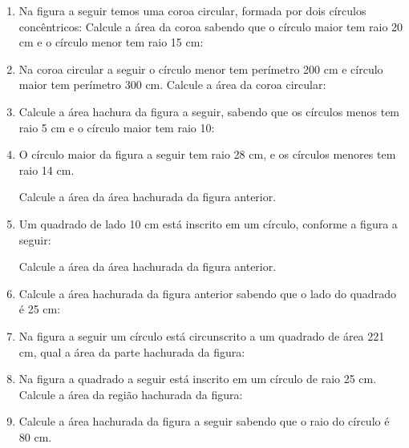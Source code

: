 \documentclass[twocolumn,oneside,a4paper,10pt]{article}
\begin{document}
\maketitle

\thispagestyle{empty}
\begin{enumerate}
\item Na figura a seguir temos uma coroa circular, formada por dois círculos concêntricos:
\noindent Calcule a área da coroa sabendo que o círculo maior tem raio 20 cm e o círculo menor tem raio 15 cm:

\item Na coroa circular a seguir o círculo menor tem perímetro 200 cm e círculo maior tem perímetro 300 cm.
\noindent Calcule a área da coroa circular:

\item Calcule a área hachura da figura a seguir, sabendo que os círculos menos tem raio 5 cm e o círculo maior tem raio 10:

\item O círculo maior da figura a seguir tem raio 28 cm, e os círculos menores tem raio 14 cm.

\noindent Calcule a área da área hachurada da figura anterior.

\item Um quadrado de lado 10 cm está inscrito em um círculo, conforme a figura a seguir:

\noindent Calcule a área da área hachurada da figura anterior.

\item Calcule a área hachurada da figura anterior sabendo que o lado do quadrado é 25 cm:

\item Na figura a seguir um círculo está circunscrito a um quadrado de área 221 cm, qual a área da parte hachurada da figura:

\item Na figura a quadrado  a seguir está inscrito em um círculo de raio 25 cm. Calcule a área da região hachurada da figura: 

\newpage
\thispagestyle{empty}
\item Calcule a área hachurada da figura a seguir sabendo que o raio do círculo é 80 cm.


\end{enumerate}
\end{document}
